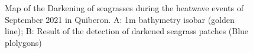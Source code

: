 \documentclass[
  number]{elsarticle}
\begin{document}
\label{cell-fig-Map_darkening_Bathy}
\begin{figure}[H]


\caption{\label{fig-Map_darkening_Bathy}Map of the Darkening of
seagrasses during the heatwave events of September 2021 in Quiberon. A:
1m bathymetry isobar (golden line); B: Result of the detection of
darkened seagrass patches (Blue plolygons)}

\end{figure}%


\renewcommand\refname{Bibliography}
  
\end{document}
